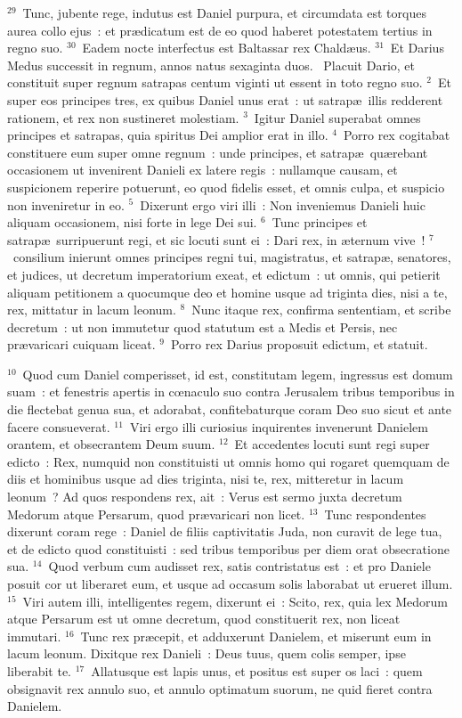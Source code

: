 ${}^{29}$~Tunc, jubente rege, indutus est Daniel purpura, et circumdata est torques aurea collo ejus~: et pr\ae dicatum est de eo quod haberet potestatem tertius in regno suo.
${}^{30}$~Eadem nocte interfectus est Baltassar rex Chald\ae us.
${}^{31}$~Et Darius Medus successit in regnum, annos natus sexaginta duos.
~Placuit Dario, et constituit super regnum satrapas centum viginti ut essent in toto regno suo.
${}^{2}$~Et super eos principes tres, ex quibus Daniel unus erat~: ut satrap\ae\ illis redderent rationem, et rex non sustineret molestiam.
${}^{3}$~Igitur Daniel superabat omnes principes et satrapas, quia spiritus Dei amplior erat in illo.
${}^{4}$~Porro rex cogitabat constituere eum super omne regnum~: unde principes, et satrap\ae\ qu\ae rebant occasionem ut invenirent Danieli ex latere regis~: nullamque causam, et suspicionem reperire potuerunt, eo quod fidelis esset, et omnis culpa, et suspicio non inveniretur in eo.
${}^{5}$~Dixerunt ergo viri illi~: Non inveniemus Danieli huic aliquam occasionem, nisi forte in lege Dei sui.
${}^{6}$~Tunc principes et satrap\ae\ surripuerunt regi, et sic locuti sunt ei~: Dari rex, in \ae ternum vive~!
${}^{7}$~consilium inierunt omnes principes regni tui, magistratus, et satrap\ae , senatores, et judices, ut decretum imperatorium exeat, et edictum~: ut omnis, qui petierit aliquam petitionem a quocumque deo et homine usque ad triginta dies, nisi a te, rex, mittatur in lacum leonum.
${}^{8}$~Nunc itaque rex, confirma sententiam, et scribe decretum~: ut non immutetur quod statutum est a Medis et Persis, nec pr\ae varicari cuiquam liceat.
${}^{9}$~Porro rex Darius proposuit edictum, et statuit.


${}^{10}$~Quod cum Daniel comperisset, id est, constitutam legem, ingressus est domum suam~: et fenestris apertis in cœnaculo suo contra Jerusalem tribus temporibus in die flectebat genua sua, et adorabat, confitebaturque coram Deo suo sicut et ante facere consueverat.
${}^{11}$~Viri ergo illi curiosius inquirentes invenerunt Danielem orantem, et obsecrantem Deum suum.
${}^{12}$~Et accedentes locuti sunt regi super edicto~: Rex, numquid non constituisti ut omnis homo qui rogaret quemquam de diis et hominibus usque ad dies triginta, nisi te, rex, mitteretur in lacum leonum~? Ad quos respondens rex, ait~: Verus est sermo juxta decretum Medorum atque Persarum, quod pr\ae varicari non licet.
${}^{13}$~Tunc respondentes dixerunt coram rege~: Daniel de filiis captivitatis Juda, non curavit de lege tua, et de edicto quod constituisti~: sed tribus temporibus per diem orat obsecratione sua.
${}^{14}$~Quod verbum cum audisset rex, satis contristatus est~: et pro Daniele posuit cor ut liberaret eum, et usque ad occasum solis laborabat ut erueret illum.
${}^{15}$~Viri autem illi, intelligentes regem, dixerunt ei~: Scito, rex, quia lex Medorum atque Persarum est ut omne decretum, quod constituerit rex, non liceat immutari.
${}^{16}$~Tunc rex pr\ae cepit, et adduxerunt Danielem, et miserunt eum in lacum leonum. Dixitque rex Danieli~: Deus tuus, quem colis semper, ipse liberabit te.
${}^{17}$~Allatusque est lapis unus, et positus est super os laci~: quem obsignavit rex annulo suo, et annulo optimatum suorum, ne quid fieret contra Danielem.


